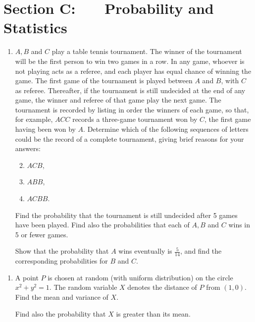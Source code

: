 \documentclass[a4, 11pt]{report}
\newlength{\qspace}
\newcounter{qnumber}
\newenvironment{question}%
 {\vspace{\qspace}
  \begin{enumerate}[\bfseries 1\quad][10]%
    \setcounter{enumi}{\value{qnumber}}%
    \item%
 }
{
  \end{enumerate}
  \filbreak
  \stepcounter{qnumber}
 }
\newenvironment{questionparts}[1][1]%
 {
  \begin{enumerate}[\bfseries (i)]%
    \setcounter{enumii}{#1}
    \addtocounter{enumii}{-1}
    \setlength{\itemsep}{5mm}
    \setlength{\parskip}{8pt}
 }
 {
  \end{enumerate}
 }
\begin{document}
	\newpage
\section*{Section C: \ \ \ Probability and Statistics}


\begin{question}
$A,B$ and $C$ play a table tennis tournament. The winner of the
tournament will be the first person to win two games in a row. In
any game, whoever is not playing acts as a referee, and each player
has equal chance of winning the game. The first game of the tournament
is played between $A$ and $B$, with $C$ as referee. Thereafter,
if the tournament is still undecided at the end of any game, the winner
and referee of that game play the next game. The tournament is recorded
by listing in order the winners of each game, so that, for example,
$ACC$ records a three-game tournament won by $C$, the first game
having been won by $A$. Determine which of the following sequences
of letters could be the record of a complete tournament, giving brief
reasons for your answers: 

\begin{questionparts}
\item $ACB$, 
\item $ABB$, 
\item $ACBB$. 
\end{questionparts}

Find the probability that the tournament is still undecided after
5 games have been played. Find also the probabilities that each of
$A,B$ and $C$ wins in 5 or fewer games. 


Show that the probability that $A$ wins eventually is $\frac{5}{14}$,
and find the corresponding probabilities for $B$ and $C$. 

\end{question}

\begin{question}
A point $P$ is chosen at random (with uniform distribution) on the
circle $x^{2}+y^{2}=1$. The random variable $X$ denotes the distance
of $P$ from $(1,0)$. Find the mean and variance of $X$. 


Find also the probability that $X$ is greater than its mean. 
\end{question}
\end{document}
